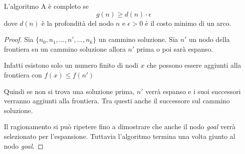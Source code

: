 \begin{theorem}
	L'algoritmo A \`e completo se
	\[ g(n) \geq d(n) \cdot \epsilon \quad \]
	dove $d(n)$ \`e la profondit\`a del nodo $n$ e $\epsilon > 0$ \`e il costo minimo di
	un arco.
	\begin{proof}
		Sia $\{ n_0, n_1, ..., n', ..., n_k \}$ un cammino soluzione. Sia $n'$ un nodo
		della frontiera su un cammino soluzione allora $n'$ prima o poi sar\`a espanso.

		Infatti esistono solo un numero finito di nodi $x$ che possono essere aggiunti
		alla frontiera con $f(x) \leq f(n')$

		Quindi se non si trova una soluzione prima, $n'$ verr\`a espanso e i suoi
		successori verranno aggiunti alla frontiera. Tra questi anche il successore sul
		cammino soluzione.

		Il ragionamento si pu\`o ripetere fino a dimostrare che anche il nodo \emph{goal}
		verr\`a selezionato per l'espansione. Tuttavia l'algoritmo termina una volta
		giunto al nodo \emph{goal}.
	\end{proof}
\end{theorem}
